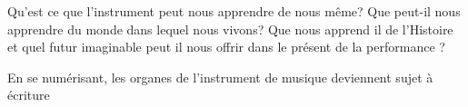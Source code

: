 Qu'est ce que l'instrument peut nous apprendre de nous même? Que peut-il nous apprendre du monde dans lequel nous vivons? Que nous apprend il de l'Histoire et quel futur imaginable peut il nous offrir dans le présent de la performance ?


En se numérisant, les organes de l'instrument de musique deviennent sujet à écriture





